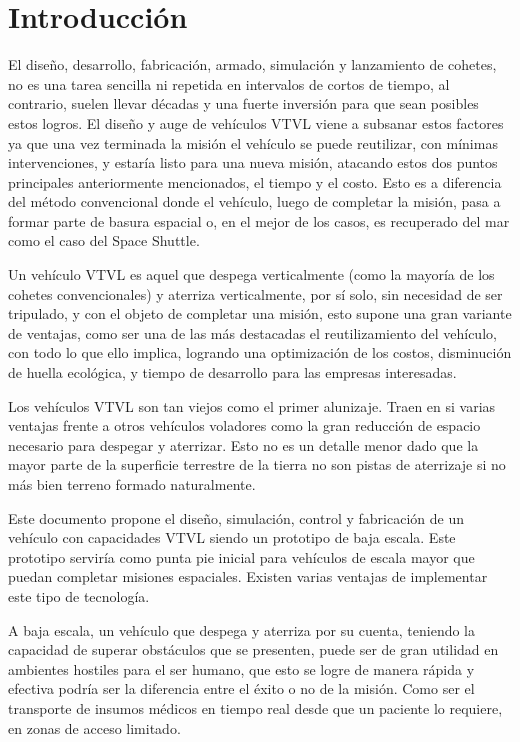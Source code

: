 
\section{Introducción}
El diseño, desarrollo, fabricación, armado, simulación y lanzamiento de cohetes, no es una tarea
sencilla ni repetida en intervalos de cortos de tiempo, al contrario, suelen llevar décadas y una
fuerte inversión para que sean posibles estos logros. El diseño y auge de vehículos VTVL viene
a subsanar estos factores ya que una vez terminada la misión el vehículo se puede reutilizar,
con mínimas intervenciones, y estaría listo para una nueva misión, atacando estos dos puntos principales anteriormente mencionados, el tiempo y el costo. Esto es a diferencia del método convencional donde el vehículo, luego de completar la misión, pasa a formar parte de basura espacial o, en el mejor de los casos, es recuperado del mar como el caso del Space Shuttle. 

\medskip

Un vehículo VTVL es aquel que despega verticalmente (como la mayoría de los cohetes
convencionales) y aterriza verticalmente, por sí solo, sin necesidad de ser tripulado, y con el
objeto de completar una misión, esto supone una gran variante de ventajas, como ser una de
las más destacadas el reutilizamiento del vehículo, con todo lo que ello implica, logrando una
optimización de los costos, disminución de huella ecológica, y tiempo de desarrollo para las empresas interesadas. %

\medskip

Los vehículos VTVL son tan viejos como el primer alunizaje. Traen en si varias ventajas frente a otros vehículos voladores como la gran reducción de espacio necesario para despegar y aterrizar. Esto no es un detalle menor dado que la mayor parte de la superficie terrestre de la tierra no son pistas de aterrizaje si no más bien terreno formado naturalmente.

\medskip

Este documento propone el diseño, simulación, control y fabricación de un vehículo con capacidades VTVL siendo un prototipo de baja escala. 
Este prototipo serviría como punta pie inicial
para vehículos de escala mayor que puedan completar misiones espaciales. Existen varias ventajas de implementar este tipo de tecnología.

\medskip

A baja escala, un vehículo que despega y aterriza por su cuenta, teniendo la capacidad de
superar obstáculos que se presenten, puede ser de gran utilidad en ambientes hostiles para el
ser humano, que esto se logre de manera rápida y efectiva podría ser la diferencia entre el
éxito o no de la misión.
Como ser el transporte de insumos médicos en tiempo real desde que un paciente lo requiere,
en zonas de acceso limitado.

